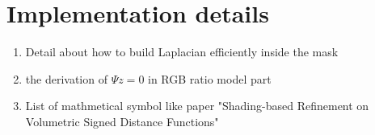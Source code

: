 \chapter{Implementation details}\label{appendix:implement}

\begin{enumerate}
    \item Detail about how to build Laplacian efficiently inside the mask
    \item the derivation of $\Psi z = 0$ in RGB ratio model part
    \item List of mathmetical symbol like paper "Shading-based Refinement on Volumetric Signed Distance Functions"
\end{enumerate}
